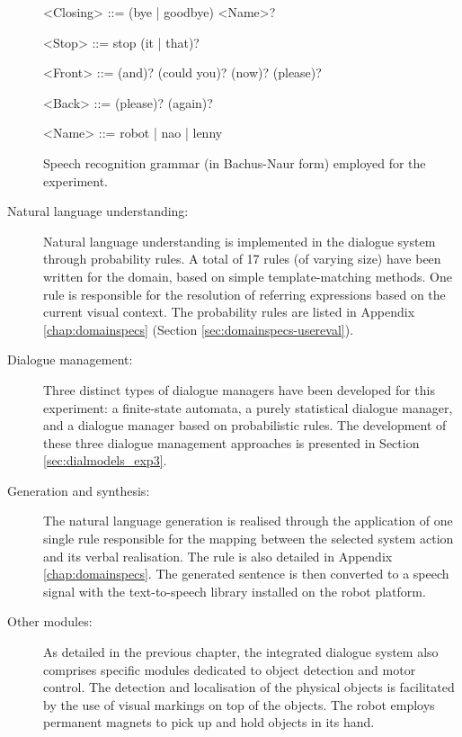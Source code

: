 \begin{description}
\begin{table}[p!]
\begin{grammar}
<Closing> ::= (bye | goodbye) <Name>?

<Stop> ::= stop (it | that)?
 
<Front> ::= (and)? (could you)? (now)? (please)?

<Back> ::= (please)? (again)?

<Name> ::= robot | nao | lenny

\end{grammar}
\caption{Speech recognition grammar (in Bachus-Naur form) employed for the experiment.}
\label{table:asr}
\end{table}

\item[Natural language understanding: ] Natural language understanding is implemented in the dialogue system through probability rules.  A total of 17 rules (of varying size) have been written for the domain, based on simple template-matching methods. One rule is responsible for the resolution of referring expressions based on the current visual context. The probability rules are listed in Appendix \ref{chap:domainspecs} (Section \ref{sec:domainspecs-usereval}). 

\item[Dialogue management: ] Three distinct types of dialogue managers have been developed for this experiment: a finite-state automata, a purely statistical dialogue manager, and a dialogue manager based on probabilistic rules.  The development of these three dialogue management approaches is presented in Section \ref{sec:dialmodels_exp3}. 

\item[Generation and synthesis: ] The natural language generation is realised through the application of one single rule responsible for the mapping between the selected system action and its verbal realisation. The rule is also detailed in Appendix \ref{chap:domainspecs}.  The generated sentence is then converted to a speech signal with the text-to-speech library installed on the robot platform. 

\item [Other modules: ] As detailed in the previous chapter, the integrated dialogue system also comprises specific modules dedicated to object detection and motor control.  The detection and localisation of the physical objects is facilitated by the use of visual markings on top of the objects.  The robot employs permanent magnets to pick up and hold objects in its hand. 

\end{description}

